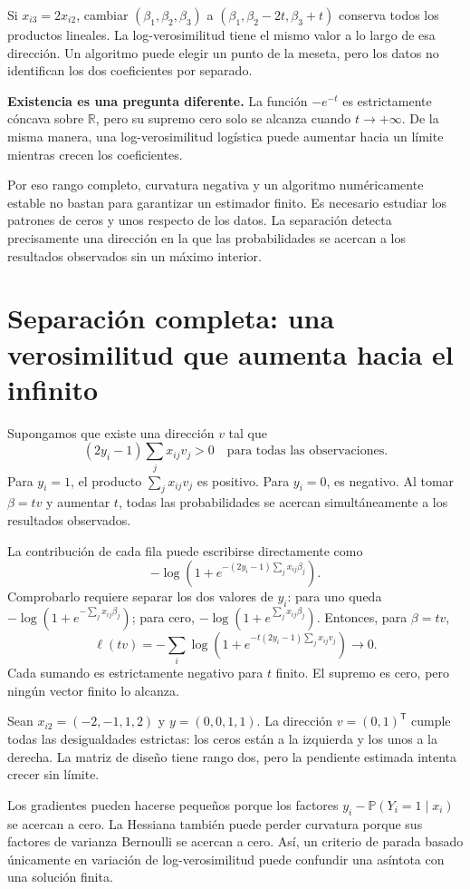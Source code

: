 \documentclass[11pt,a4paper]{article}
\newcommand{\R}{\mathbb R}
\newcommand{\Prob}{\mathbb P}
\newcommand{\T}{^{\mathsf T}}
\begin{document}
\begin{ejemplo}
Si $x_{i3}=2x_{i2}$, cambiar
$(\beta_1,\beta_2,\beta_3)$ a
$(\beta_1,\beta_2-2t,\beta_3+t)$ conserva todos los productos
lineales. La log-verosimilitud tiene el mismo valor a lo largo
de esa dirección. Un algoritmo puede elegir un punto de la meseta,
pero los datos no identifican los dos coeficientes por separado.
\end{ejemplo}
\textbf{Existencia es una pregunta diferente.}
La función $-e^{-t}$ es estrictamente cóncava sobre $\R$,
pero su supremo cero solo se alcanza cuando $t\to+\infty$.
De la misma manera, una log-verosimilitud logística puede aumentar
hacia un límite mientras crecen los coeficientes.

Por eso rango completo, curvatura negativa y un algoritmo
numéricamente estable no bastan para garantizar un estimador finito.
Es necesario estudiar los patrones de ceros y unos respecto de
los datos. La separación detecta precisamente una dirección
en la que las probabilidades se acercan a los resultados observados
sin un máximo interior.

\clearpage
\section{Separación completa: una verosimilitud que aumenta hacia el infinito}\label{logit36}
Supongamos que existe una dirección $v$ tal que
\[
(2y_i-1)\sum_jx_{ij}v_j>0\quad\text{para todas las observaciones}.
\]
Para $y_i=1$, el producto $\sum_jx_{ij}v_j$ es positivo.
Para $y_i=0$, es negativo. Al tomar $\beta=tv$ y aumentar $t$,
todas las probabilidades se acercan simultáneamente a los resultados
observados.

La contribución de cada fila puede escribirse directamente como
\[
-\log\left(1+
e^{-(2y_i-1)\sum_jx_{ij}\beta_j}\right).
\]
Comprobarlo requiere separar los dos valores de $y_i$:
para uno queda $-\log(1+e^{-\sum_jx_{ij}\beta_j})$;
para cero, $-\log(1+e^{\sum_jx_{ij}\beta_j})$.
Entonces, para $\beta=tv$,
\[
\ell(tv)=-\sum_i\log\left(1+
e^{-t(2y_i-1)\sum_jx_{ij}v_j}\right)\longrightarrow0.
\]
Cada sumando es estrictamente negativo para $t$ finito.
El supremo es cero, pero ningún vector finito lo alcanza.

\begin{ejemplo}
Sean $x_{i2}=(-2,-1,1,2)$ y $y=(0,0,1,1)$.
La dirección $v=(0,1)\T$ cumple todas las desigualdades estrictas:
los ceros están a la izquierda y los unos a la derecha.
La matriz de diseño tiene rango dos, pero la pendiente estimada
intenta crecer sin límite.
\end{ejemplo}
Los gradientes pueden hacerse pequeños porque los factores
$y_i-\Prob(Y_i=1\mid x_i)$ se acercan a cero.
La Hessiana también puede perder curvatura porque sus factores
de varianza Bernoulli se acercan a cero.
Así, un criterio de parada basado únicamente en variación de
log-verosimilitud puede confundir una asíntota con una solución finita.
\end{document}
